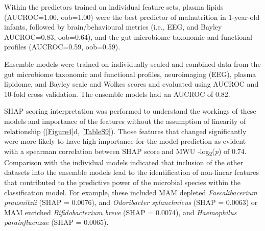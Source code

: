 \documentclass{article}
\begin{document}
Within the predictors trained on individual feature sets, plasma lipids (AUCROC=1.00, oob=1.00) were the best predictor of malnutrition in 1-year-old infants, followed by brain/behavioural metrics (i.e., EEG, and Bayley AUCROC=0.83, oob=0.64), and the gut microbiome taxonomic and functional profiles (AUCROC=0.59, oob=0.59).

Ensemble models were trained on individually scaled and combined data from the gut microbiome taxonomic and functional profiles, neuroimaging (EEG), plasma lipidome, and Bayley scale and Wolkes scores and evaluated using AUCROC and 10-fold cross validation.
The ensemble models had an AUCROC of 0.82.

\gls{SHAP} scoring interpretation was performed to understand the workings of these models and importance of the features without the assumption of linearity of relationship (\autoref{Figure4}d, \autoref{TableS9}).
Those features that changed significantly were more likely to have high importance for the model prediction as evident with a spearman correlation between SHAP score and \gls{MWU} -log\textsubscript{2}(\textit{p}) of 0.74.
Comparison with the individual models indicated that inclusion of the other datasets into the ensemble models lead to the identification of non-linear features that contributed to the predictive power of the microbial species within the classification model.
For example, these included \gls{MAM} depleted \textit{Faecalibacerium prausnitzii} (SHAP = 0.0076), and \textit{Odoribacter splanchnicus} (SHAP = 0.0063) or \gls{MAM} enriched \textit{Bifidobacterium breve} (SHAP = 0.0074), and \textit{Haemophilus parainfluenzae} (SHAP = 0.0065).
\end{document}
